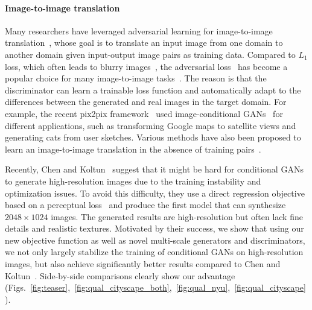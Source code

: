 \documentclass[10pt,twocolumn,letterpaper]{article}
\newcommand{\LOneLoss}{$L_1$ }
\newcommand{\ck}{Chen and Koltun~\cite{chen2017photographic}\xspace}
\newcommand{\pp}{pix2pix\xspace}
\begin{document}
\paragraph{Image-to-image translation}
Many researchers have leveraged adversarial learning for image-to-image translation~\cite{isola2016image}, whose goal is to translate an input image from one domain to another domain given input-output image pairs as training data.
Compared to \LOneLoss loss, which often leads to blurry images~\cite{isola2016image,johnson2016perceptual}, 
the adversarial loss~\cite{goodfellow2014generative} has become a popular choice for many image-to-image tasks~\cite{wang2016generative,pathak2016context,karacan2016learning,zhang2017age,ledig2016photo,sangkloy2016scribbler,kaneko2017generative,dong2017semantic,zhu2017toward}. The reason is that the discriminator can learn a trainable loss function and automatically adapt to the differences between the generated and real images in the target domain. For example, the recent \pp framework~\cite{isola2016image} used image-conditional GANs~\cite{mirza2014conditional} for different applications, such as transforming Google maps to satellite views and generating cats from user sketches. Various methods have also been proposed to learn an image-to-image translation in the absence of training pairs~\cite{liu2016coupled,bousmalis2016unsupervised,liu2016unsupervised,shrivastava2016learning,taigman2016unsupervised,yi2017dualgan,zhu2017unpaired,tungadversarial}.

Recently, \ck suggest that it might be hard for conditional GANs to generate high-resolution images due to the training instability and optimization issues. To avoid this difficulty, they use a direct regression objective based on a perceptual loss~\cite{gatys2016image,dosovitskiy2016generating,johnson2016perceptual} and produce the first model that can synthesize $2048\times 1024$ images. The generated results are high-resolution but often lack fine details and realistic textures. Motivated by their success, we show that using our new objective function as well as novel multi-scale generators and discriminators, we not only largely stabilize the training of conditional GANs on high-resolution images, but also achieve significantly better results compared to \ck. Side-by-side comparisons clearly show our advantage (Figs.~\ref{fig:teaser},~\ref{fig:qual_cityscape_both},~\ref{fig:qual_nyu},~\ref{fig:qual_cityscape}). 
\end{document}
